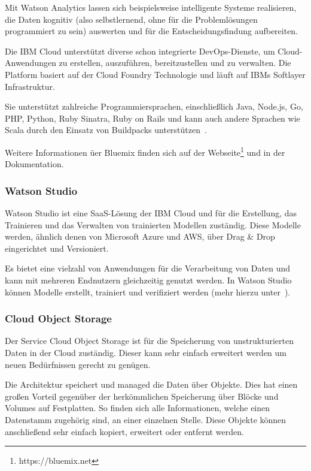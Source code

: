 Mit Watson Analytics lassen sich beispielsweise intelligente Systeme realisieren, die Daten kognitiv (also selbstlernend,
ohne für die Problemlösungen programmiert zu sein) auswerten und für die Entscheidungsfindung aufbereiten.

Die IBM Cloud unterstützt diverse schon integrierte DevOps-Dienste, um Cloud-Anwendungen zu erstellen, auszuführen,
bereitzustellen und zu verwalten. Die Platform basiert auf der Cloud Foundry Technologie und läuft auf IBMs
Softlayer Infrastruktur.

Sie unterstützt zahlreiche Programmiersprachen, einschließlich Java, Node.js, Go, PHP, Python, Ruby Sinatra, Ruby on
Rails und kann auch andere Sprachen wie Scala durch den Einsatz von Buildpacks unterstützen~\cite{book_grundlagen_bluemix}.

Weitere Informationen üer Bluemix finden sich auf der Webseite\footnote{https://bluemix.net} und in der Dokumentation.

\subsubsection{Watson Studio}
Watson Studio ist eine SaaS-Lösung der IBM Cloud und für die Erstellung, das Trainieren und das Verwalten von trainierten
Modellen zuständig. Diese Modelle werden, ähnlich denen von Microsoft Azure und AWS, über Drag \& Drop eingerichtet
und Versioniert.

Es bietet eine vielzahl von Anwendungen für die Verarbeitung von Daten und kann mit mehreren Endnutzern gleichzeitig
genutzt werden. In Watson Studio können Modelle erstellt, trainiert und verifiziert werden (mehr hierzu
unter~\cite{online_grundlagen_watson_studio}).

\subsubsection{Cloud Object Storage}
Der Service Cloud Object Storage ist für die Speicherung von unstrukturierten Daten in der Cloud zuständig. Dieser kann
sehr einfach erweitert werden um neuen Bedürfnissen gerecht zu genügen.

Die Architektur speichert und managed die Daten über Objekte. Dies hat einen großen Vorteil gegenüber der herkömmlichen
Speicherung über Blöcke und Volumes auf Festplatten. So finden sich alle Informationen, welche einen Datenstamm zugehörig
sind, an einer einzelnen Stelle. Diese Objekte können anschließend sehr einfach kopiert, erweitert oder entfernt werden.

